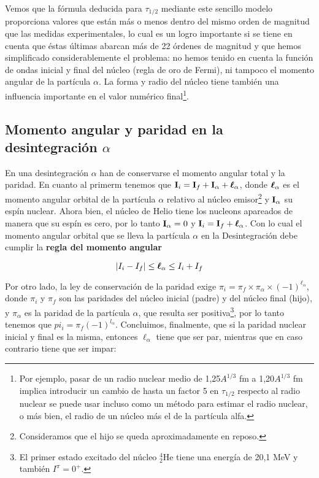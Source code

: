 Vemos que la fórmula deducida para $\tau_{1/2}$ mediante este sencillo modelo proporciona valores que están más o menos dentro del mismo orden de magnitud que las medidas experimentales, lo cual es un logro importante si se tiene en cuenta que éstas últimas abarcan más de 22 órdenes de magnitud y que hemos simplificado considerablemente el problema: no hemos tenido en cuenta la función de ondas inicial y final del núcleo (regla de oro de Fermi), ni tampoco el momento angular de la partícula $\alpha$. La forma y radio del núcleo tiene también una influencia importante en el valor numérico final\footnote{Por ejemplo, pasar de un radio nuclear medio de 1,25$A^{1/3}$ fm a 1,20$A^{1/3}$ fm implica introducir un cambio de hasta un factor 5 en $\tau_{1/2}$ respecto al radio nuclear se puede usar incluso como un método para estimar el radio nuclear, o más bien, el radio de un núcleo más el de la partícula alfa.}.


\subsection{Momento angular y paridad en la desintegración $\alpha$}

En una desintegración $\alpha$ han de conservarse el momento angular total y la paridad. En cuanto al primerm tenemos que $\mathbf{I}_i = \mathbf{I}_f + \mathbf{I}_\alpha + \boldsymbol{\ell}_\alpha$, donde $\boldsymbol{\ell}_\alpha$ es el momento angular orbital de la partícula $\alpha$ relativo al núcleo emisor\footnote{Consideramos que el hijo se queda aproximadamente en reposo.} y $\mathbf{I}_\alpha$ su espín nuclear. Ahora bien, el núcleo de Helio tiene los nucleons apareados de manera que su espín es cero, por lo tanto $\mathbf{I}_\alpha  =0$ y $\mathbf{I}_i = \mathbf{I}_f + \boldsymbol{\ell}_\alpha$. Con lo cual el momento angular orbital que se lleva la partícula $\alpha$ en la Desintegración debe cumplir la \textbf{regla del momento angular}

\begin{mybox}
\begin{equation}
    |I_i-I_f|\leq \boldsymbol{\ell}_\alpha \leq I_i + I_f
\end{equation}
\end{mybox}
Por otro lado, la ley de conservación de la paridad exige $\pi_i=\pi_f \times \pi_\alpha \times (-1)^{\ell_\alpha}$, donde $\pi_i$ y $\pi_f$ son las paridades del núcleo inicial (padre) y del núcleo final (hijo), y $\pi_\alpha$ es la paridad de la partícula $\alpha$, que resulta ser positiva\footnote{El primer estado excitado del núcleo $^4_2$He tiene una energía de 20,1 MeV y también $I^\pi = 0^+$.}, por lo tanto tenemos que $pi_i = \pi_f (-1)^{l_\alpha}$. Concluimos, finalmente, que si la paridad nuclear inicial y final es la misma, entonces $\ell_\alpha$ tiene que ser par, mientras que en caso contrario tiene que ser impar:

